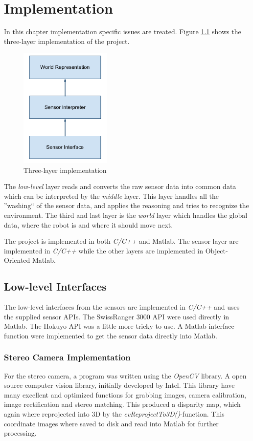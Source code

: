 
\chapter{Implementation}
In this chapter implementation specific issues are treated. Figure
\ref{chap6:fig-implementation} shows the three-layer implementation of the project.
\begin{figure}[htbp]
    \centering
    \includegraphics[width=0.4\textwidth]{pics/implementation}
    \caption{Three-layer implementation}
    \label{chap6:fig-implementation}
\end{figure}
The \emph{low-level} layer reads and converts the raw sensor data into common data which can be
interpreted by the \emph{middle} layer. This layer handles all the ''washing`` of the
sensor data, and applies the reasoning and tries to recognize the environment. The third
and last layer is the \emph{world} layer which handles the global data, where the robot is
and where it should move next. 

The project is implemented in both \emph{C/C++} and Matlab. The sensor layer are
implemented in \emph{C/C++} while the other layers are implemented in Object-Oriented
Matlab. 

\section{Low-level Interfaces}
The low-level interfaces from the sensors are implemented in \emph{C/C++} and uses the
supplied sensor APIs. The SwissRanger 3000 API were used directly in Matlab. The Hokuyo
API was a little more tricky to use. A Matlab interface function were implemented to get
the sensor data directly into Matlab.

\subsection{Stereo Camera Implementation}
For the stereo camera, a program was written using the \emph{OpenCV} library. A open
source computer vision library, initially developed by Intel. This library have many
excellent and optimized functions for grabbing images, camera calibration, image rectification
and stereo matching. This produced a disparity map, which again where reprojected into 3D
by the \emph{cvReprojectTo3D()}-function. This coordinate images where saved to disk and
read into Matlab for further processing. 

